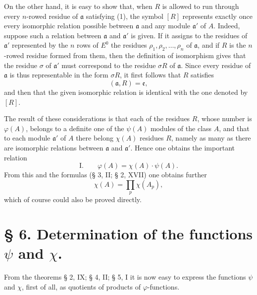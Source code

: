 On the other hand, it is easy to show that, when $R$ is allowed to run through every $n$-rowed residue of $\mathfrak a$ satisfying (1), the symbol $[R]$ represents exactly once every isomorphic relation possible between $\mathfrak a$ and any module $\mathfrak a'$ of $A$. Indeed, suppose such a relation between $\mathfrak a$ and $\mathfrak a'$ is given. If it assigns to the residues of $\mathfrak a'$ represented by the $n$ rows of $E^0$ the residues $\rho_1,\rho_2,\ldots,\rho_n$ of $\mathfrak a$, and if $R$ is the $n$-rowed residue formed from them, then the definition of isomorphism gives that the residue $\sigma$ of $\mathfrak a'$ must correspond to the residue $\sigma R$ of $\mathfrak a$. Since every residue of $\mathfrak a$ is thus representable in the form $\sigma R$, it first follows that $R$ satisfies
\[
 (\mathfrak a,R)=\mathfrak e,
\]
and then that the given isomorphic relation is identical with the one denoted by $[R]$.

The result of these considerations is that each of the residues $R$, whose number is $\varphi(A)$, belongs to a definite one of the $\psi(A)$ modules of the class $A$, and that to each module $\mathfrak a'$ of $A$ there belong $\chi(A)$ residues $R$, namely as many as there are isomorphic relations between $\mathfrak a$ and $\mathfrak a'$. Hence one obtains the important relation
\[
\text{I.}\qquad \varphi(A)=\chi(A)\cdot\psi(A).
\]
From this and the formulas (§ 3, II; § 2, XVII) one obtains further
\[
 \chi(A)=\prod_p \chi(A_p),
\]
which of course could also be proved directly.

\section*{§ 6. Determination of the functions $\psi$ and $\chi$.}

From the theorems § 2, IX; § 4, II; § 5, I it is now easy to express the functions $\psi$ and $\chi$, first of all, as quotients of products of $\varphi$-functions.

